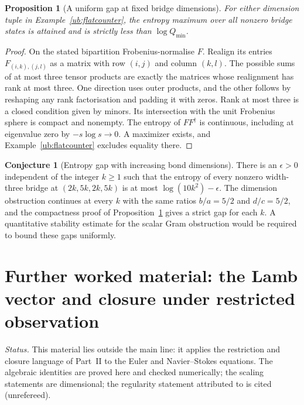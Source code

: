 \documentclass[aps,pra,onecolumn,superscriptaddress,nofootinbib,10pt]{revtex4-2}
\newtheorem{proposition}[theorem]{Proposition}
\theoremstyle{definition}
\newtheorem{conjecture}[theorem]{Conjecture}
\theoremstyle{remark}
\begin{document}
\begin{proposition}[A uniform gap at fixed bridge dimensions]\label{ub:compact}
For either dimension tuple in Example~\ref{ub:flatcounter}, the entropy
maximum over all nonzero bridge states is attained and is strictly
less than $\log Q_{\min}$.
\end{proposition}
\begin{proof}
On the stated bipartition Frobenius-normalise $F$. Realign its entries
$F_{(i,k),(j,l)}$ as a matrix with row $(i,j)$ and column $(k,l)$.
The possible sums of at most three tensor products are exactly the
matrices whose realignment has rank at most three. One direction
uses outer products, and the other follows by reshaping any rank
factorisation and padding it with zeros. Rank at most three is a
closed condition given by minors. Its intersection with the unit
Frobenius sphere is compact and nonempty. The entropy of $FF^\dagger$
is continuous, including at eigenvalue zero by $-s\log s\to0$.
A maximizer exists, and Example~\ref{ub:flatcounter} excludes
equality there.
\end{proof}

\begin{conjecture}[Entropy gap with increasing bond dimensions]\label{ub:uniform}
There is an $\epsilon>0$ independent of the integer $k\ge1$ such
that the entropy of every nonzero width-three bridge at
$(2k,5k,2k,5k)$ is at most $\log(10k^2)-\epsilon$. The dimension obstruction continues at every
$k$ with the same ratios $b/a=5/2$ and $d/c=5/2$, and the
compactness proof of Proposition~\ref{ub:compact} gives a strict gap
for each $k$. A quantitative stability estimate for the scalar
Gram obstruction would be required to bound these gaps uniformly.
\end{conjecture}


\section{Further worked material: the Lamb vector and closure under restricted observation}\label{app:fluid}
\noindent\emph{Status.}  This material lies outside the main line: it applies the restriction and closure language of
Part~II to the Euler and Navier--Stokes equations.  The algebraic identities are proved here and checked numerically;
the scaling statements are dimensional; the regularity statement attributed to \cite{obr:MildPath} is cited (unrefereed).
\end{document}

